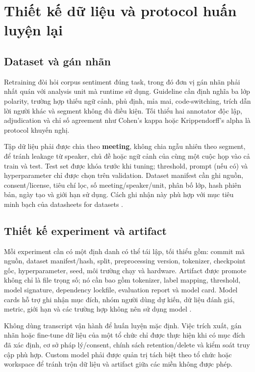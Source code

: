 \section{Thiết kế dữ liệu và protocol huấn luyện lại}
\subsection{Dataset và gán nhãn}
Retraining đòi hỏi corpus sentiment đúng task, trong đó đơn vị gán nhãn phải nhất quán với analysis unit mà runtime sử dụng. Guideline cần định nghĩa ba lớp polarity, trường hợp thiếu ngữ cảnh, phủ định, mỉa mai, code-switching, trích dẫn lời người khác và segment không đủ điều kiện. Tối thiểu hai annotator độc lập, adjudication và chỉ số agreement như Cohen's kappa hoặc Krippendorff's alpha là protocol khuyến nghị.

Tập dữ liệu phải được chia theo \textbf{meeting}, không chia ngẫu nhiên theo segment, để tránh leakage từ speaker, chủ đề hoặc ngữ cảnh của cùng một cuộc họp vào cả train và test. Test set được khóa trước khi tuning; threshold, prompt (nếu có) và hyperparameter chỉ được chọn trên validation. Dataset manifest cần ghi nguồn, consent/license, tiêu chí lọc, số meeting/speaker/unit, phân bố lớp, hash phiên bản, ngày tạo và giới hạn sử dụng. Cách ghi nhận này phù hợp với mục tiêu minh bạch của datasheets for datasets \cite{gebru2021}.

\subsection{Thiết kế experiment và artifact}
Mỗi experiment cần có một định danh có thể tái lập, tối thiểu gồm: commit mã nguồn, dataset manifest/hash, split, preprocessing version, tokenizer, checkpoint gốc, hyperparameter, seed, môi trường chạy và hardware. Artifact được promote không chỉ là file trọng số; nó cần bao gồm tokenizer, label mapping, threshold, model signature, dependency lockfile, evaluation report và model card. Model cards hỗ trợ ghi nhận mục đích, nhóm người dùng dự kiến, dữ liệu đánh giá, metric, giới hạn và các trường hợp không nên sử dụng model \cite{mitchell2019}.

Không dùng transcript vận hành để huấn luyện mặc định. Việc trích xuất, gán nhãn hoặc fine-tune dữ liệu của một tổ chức chỉ được thực hiện khi có mục đích đã xác định, cơ sở pháp lý/consent, chính sách retention/delete và kiểm soát truy cập phù hợp. Custom model phải được quản trị tách biệt theo tổ chức hoặc workspace để tránh trộn dữ liệu và artifact giữa các miền không được phép.

